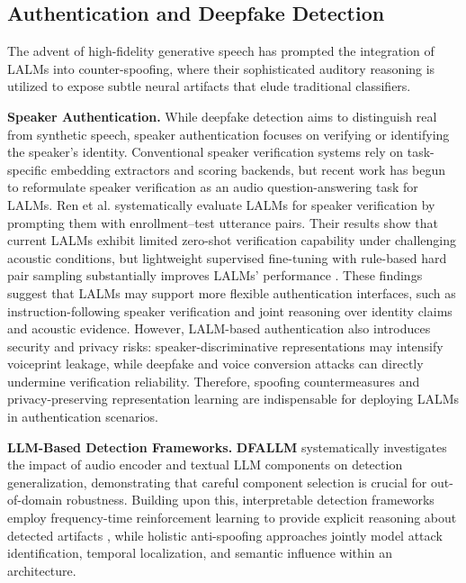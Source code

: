 \subsection{Authentication and Deepfake Detection}
The advent of high-fidelity generative speech has prompted the integration of LALMs into counter-spoofing, where their sophisticated auditory reasoning is utilized to expose subtle neural artifacts that elude traditional classifiers.

\textbf{Speaker Authentication.}
While deepfake detection aims to distinguish real from synthetic speech, speaker authentication focuses on verifying or identifying the speaker's identity. Conventional speaker verification systems rely on task-specific embedding extractors and scoring backends, but recent work has begun to reformulate speaker verification as an audio question-answering task for LALMs. Ren et al. \cite{ren2025audiolargelanguagemodels} systematically evaluate LALMs for speaker verification by prompting them with enrollment--test utterance pairs. Their results show that current LALMs exhibit limited zero-shot verification capability under challenging acoustic conditions, but lightweight supervised fine-tuning with rule-based hard pair sampling substantially improves LALMs' performance \cite{ren2025audiolargelanguagemodels}. These findings suggest that LALMs may support more flexible authentication interfaces, such as instruction-following speaker verification and joint reasoning over identity claims and acoustic evidence. However, LALM-based authentication also introduces security and privacy risks: speaker-discriminative representations may intensify voiceprint leakage, while deepfake and voice conversion attacks can directly undermine verification reliability. Therefore, spoofing countermeasures and privacy-preserving representation learning are indispensable for deploying LALMs in authentication scenarios.

\textbf{LLM-Based Detection Frameworks.} \textbf{DFALLM} \cite{li2025dfallm} systematically investigates the impact of audio encoder and textual LLM components on detection generalization, demonstrating that careful component selection is crucial for out-of-domain robustness. Building upon this, interpretable detection frameworks employ frequency-time reinforcement learning to provide explicit reasoning about detected artifacts \cite {xie2026interpretable}, while holistic anti-spoofing approaches \cite{xu2026holiantispoof} jointly model attack identification, temporal localization, and semantic influence within an architecture.

